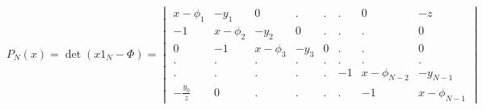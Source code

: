 \begin{equation}
    P_N(x) = \det(x 1_N -\Phi) =  \begin{vmatrix}
    x-\phi_1 & -y_1 & 0 & . & . & . & 0  & -z\\
    -1 & x-\phi_2 & -y_2 & 0 & . & . & . & 0\\
    0 & -1 & x-\phi_3 & -y_3 & 0 & . & . & 0\\
    . & . & . & . & . & . & . & . \\
    . & . & .& .& .& -1 & x-\phi_{N-2} & -y_{N-1}\\
    -\frac{y_0}{z} & 0 & . & .& .& . & -1 & x-\phi_{N-1}\end{vmatrix}
\end{equation}

